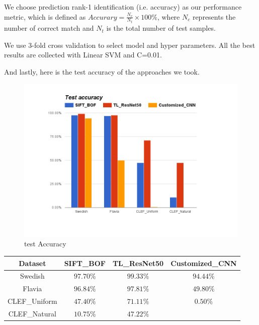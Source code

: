 \documentclass[journal, 10pt]{IEEEtran}
\begin{document}
We choose prediction rank-1 identification (i.e. accuracy) as our performance metric, which is defined as $Accurary = \frac{N_c}{N_t} \times 100 \%$, where $N_c$ represents the number of correct match and $N_t$ is the total number of test samples.

We use 3-fold cross validation to select model and hyper parameters. All the best results are collected with Linear SVM and C=0.01.

And lastly, here is the test accuracy of the approaches we took.
\begin{figure}[H]
  \centering
  \includegraphics[width=1.00\linewidth]{test_accuracy_with_customized_cnn}
  \caption{ test Accuracy }
  \label{fig:test_accuracy}
\end{figure}

\begin{tabular}{c@{}c@{}c@{}c@{}}
Dataset       & SIFT\_BOF & TL\_ResNet50  & Customized\_CNN \\
\hline
Swedish       & $97.70\%$ & $99.33\%$     & $94.44\%$ \\
Flavia        & $96.84\%$ & $97.81\%$     & $49.80\%$ \\
CLEF\_Uniform & $47.40\%$ & $71.11\%$     & $0.50\%$  \\
CLEF\_Natural & $10.75\%$ & $47.22\%$     &
\end{tabular}
\end{document}
